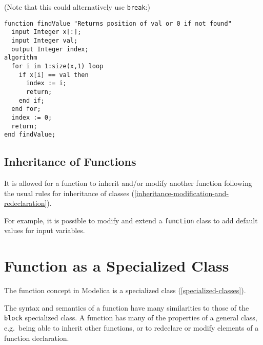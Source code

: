 \begin{example}
(Note that this could alternatively use \lstinline!break!:)
\begin{lstlisting}[language=modelica]
function findValue "Returns position of val or 0 if not found"
  input Integer x[:];
  input Integer val;
  output Integer index;
algorithm
  for i in 1:size(x,1) loop
    if x[i] == val then
      index := i;
      return;
    end if;
  end for;
  index := 0;
  return;
end findValue;
\end{lstlisting}
\end{example}

\subsection{Inheritance of Functions}\label{inheritance-of-functions}

It is allowed for a function to inherit and/or modify another function
following the usual rules for inheritance of classes (\cref{inheritance-modification-and-redeclaration}).

\begin{nonnormative}
For example, it is possible to modify and extend a \lstinline!function! class to add default values for input variables.
\end{nonnormative}

\section{Function as a Specialized Class}\label{function-as-a-specialized-class}

The function concept in Modelica is a specialized class (\cref{specialized-classes}).

\begin{nonnormative}
The syntax and semantics of a function have many similarities to those of the \lstinline!block! specialized class. A function has many of the properties
of a general class, e.g.\ being able to inherit other functions, or to redeclare or modify elements of a function declaration.
\end{nonnormative}

